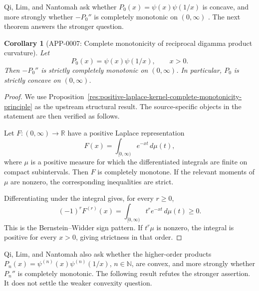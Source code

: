 \documentclass[11pt]{article}
\numberwithin{equation}{section}
\newtheorem{corollary}[theorem]{Corollary}
\theoremstyle{definition}
\theoremstyle{remark}
\newcommand{\N}{\mathbb N}
\newcommand{\1}{\mathbf 1}
\begin{document}
Qi, Lim, and Nantomah ask whether \(P_0(x)=\psi(x)\psi(1/x)\) is concave, and more strongly whether \(-P_0''\) is completely monotonic on \((0,\infty)\) \cite{qi-lim-nantomah-polygamma}.  The next theorem answers the stronger question.

\begin{corollary}[APP-0007: Complete monotonicity of reciprocal digamma product curvature]
\label{thm:reciprocal-digamma-product-complete-monotonicity}
Let
\begin{equation}
\label{eq:reciprocal-digamma-p0}
P_0(x)=\psi(x)\psi(1/x),\qquad x>0.
\end{equation}
Then \(-P_0''\) is strictly completely monotonic on \((0,\infty)\).  In particular, \(P_0\) is strictly concave on \((0,\infty)\).


\end{corollary}

\begin{proof}
We use Proposition~\ref{res:positive-laplace-kernel-complete-monotonicity-principle} as the upstream structural result. The source-specific objects in the statement are then verified as follows.

Let \(F:(0,\infty)\to\mathbb R\) have a positive Laplace representation
\[
F(x)=\int_{[0,\infty)}e^{-xt}\,d\mu(t),
\]
where \(\mu\) is a positive measure for which the differentiated integrals are finite on compact subintervals. Then \(F\) is completely monotone. If the relevant moments of \(\mu\) are nonzero, the corresponding inequalities are strict.

Differentiating under the integral gives, for every \(r\ge0\),
\[
(-1)^rF^{(r)}(x)=\int_{[0,\infty)}t^r e^{-xt}\,d\mu(t)\ge0.
\]
This is the Bernstein--Widder sign pattern. If \(t^r\mu\) is nonzero, the integral is positive for every \(x>0\), giving strictness in that order.
\end{proof}

Qi, Lim, and Nantomah also ask whether the higher-order products \(P_n(x)=\psi^{(n)}(x)\psi^{(n)}(1/x)\), \(n\in\N\), are convex, and more strongly whether \(P_n''\) is completely monotonic.  The following result refutes the stronger assertion.  It does not settle the weaker convexity question.
\end{document}
